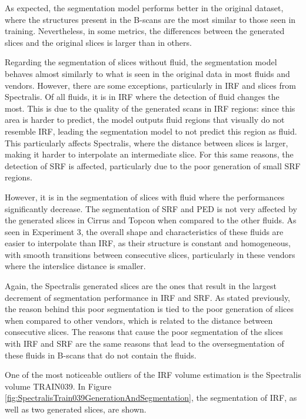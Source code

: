 As expected, the segmentation model performs better in the original dataset, where the structures present in the B-scans are the most similar to those seen in training. Nevertheless, in some metrics, the differences between the generated slices and the original slices is larger than in others.
\par
Regarding the segmentation of slices without fluid, the segmentation model behaves almost similarly to what is seen in the original data in most fluids and vendors. However, there are some exceptions, particularly in IRF and slices from Spectralis. Of all fluids, it is in IRF where the detection of fluid changes the most. This is due to the quality of the generated scans in IRF regions: since this area is harder to predict, the model outputs fluid regions that visually do not resemble IRF, leading the segmentation model to not predict this region as fluid. This particularly affects Spectralis, where the distance between slices is larger, making it harder to interpolate an intermediate slice. For this same reasons, the detection of SRF is affected, particularly due to the poor generation of small SRF regions.
\par
However, it is in the segmentation of slices with fluid where the performances significantly decrease. The segmentation of SRF and PED is not very affected by the generated slices in Cirrus and Topcon when compared to the other fluids. As seen in Experiment 3, the overall shape and characteristics of these fluids are easier to interpolate than IRF, as their structure is constant and homogeneous, with smooth transitions between consecutive slices, particularly in these vendors where the interslice distance is smaller.
\par
Again, the Spectralis generated slices are the ones that result in the largest decrement of segmentation performance in IRF and SRF. As stated previously, the reason behind this poor segmentation is tied to the poor generation of slices when compared to other vendors, which is related to the distance between consecutive slices. The reasons that cause the poor segmentation of the slices with IRF and SRF are the same reasons that lead to the oversegmentation of these fluids in B-scans that do not contain the fluids.
\par
One of the most noticeable outliers of the IRF volume estimation is the Spectralis volume TRAIN039. In Figure \ref{fig:SpectralisTrain039GenerationAndSegmentation}, the segmentation of IRF, as well as two generated slices, are shown.


